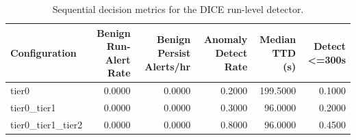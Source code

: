 \begin{table}[t]
\centering
\caption{Sequential decision metrics for the DICE run-level detector.}
\label{tab:dice_sequential_metrics}
\footnotesize
\begin{tabular}{lrrrrr}
\toprule
Configuration & Benign Run-Alert Rate & Benign Persist Alerts/hr & Anomaly Detect Rate & Median TTD (s) & Detect <=300s \\
\midrule
tier0 & 0.0000 & 0.0000 & 0.2000 & 199.5000 & 0.1000 \\
tier0_tier1 & 0.0000 & 0.0000 & 0.3000 & 96.0000 & 0.2000 \\
tier0_tier1_tier2 & 0.0000 & 0.0000 & 0.8000 & 96.0000 & 0.4500 \\
\bottomrule
\end{tabular}

\end{table}
